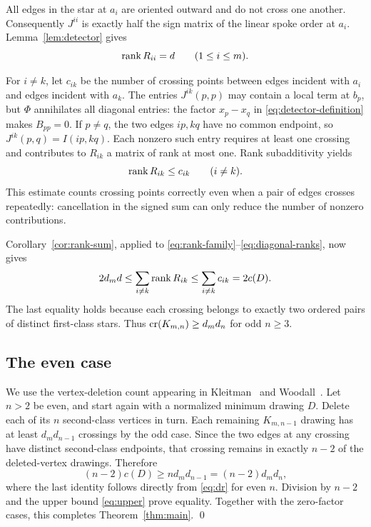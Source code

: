 All edges in the star at $a_i$ are oriented outward and do not cross one
another. Consequently $J^{ii}$ is exactly half the sign matrix of the
linear spoke order at $a_i$. Lemma~\ref{lem:detector} gives
\begin{equation}
\label{eq:diagonal-ranks}
 \operatorname{rank} R_{ii}=d\qquad(1\le i\le m).
\end{equation}

For $i\ne k$, let $c_{ik}$ be the number of crossing points between
edges incident with $a_i$ and edges incident with $a_k$.
The entries $J^{ik}(p,p)$ may contain a local term at $b_p$, but $\Phi$
annihilates all diagonal entries: the factor $x_p-x_q$ in
\eqref{eq:detector-definition} makes $B_{pp}=0$.
If $p\ne q$, the two edges $ip,kq$
have no common endpoint, so $J^{ik}(p,q)=I(ip,kq)$.
Each nonzero such entry requires at least one crossing and contributes
to $R_{ik}$ a matrix of rank at most one. Rank subadditivity yields
\begin{equation}
\label{eq:crossing-rank}
 \operatorname{rank} R_{ik}\le c_{ik}\qquad(i\ne k).
\end{equation}
This estimate counts crossing points correctly even when a pair of
edges crosses repeatedly: cancellation in the signed sum can only reduce
the number of nonzero contributions.

Corollary~\ref{cor:rank-sum}, applied to
\eqref{eq:rank-family}--\eqref{eq:diagonal-ranks}, now gives
\[
 2d_m d
 \le \sum_{i\ne k}\operatorname{rank} R_{ik}
 \le \sum_{i\ne k}c_{ik}
 =2c(D).
\]
The last equality holds because each crossing belongs to exactly two
ordered pairs of distinct first-class stars.
Thus $\operatorname{cr}(K_{m,n})\ge d_m d_n$ for odd $n\ge3$.

\subsection{The even case}
We use the vertex-deletion count appearing in
Kleitman~\cite[Section~3, equations~(6)--(7)]{Kleitman1970} and
Woodall~\cite[Theorem~1 and Corollary~1.1]{Woodall1993}.
Let $n>2$ be even, and start again with a normalized minimum drawing $D$.
Delete each of its $n$ second-class vertices in turn. Each remaining
$K_{m,n-1}$ drawing has at least $d_m d_{n-1}$ crossings by the odd case.
Since the two edges at any crossing have distinct second-class endpoints,
that crossing remains in exactly $n-2$ of the deleted-vertex drawings.
Therefore
\[
 (n-2)c(D)\ge n d_m d_{n-1}=(n-2)d_m d_n,
\]
where the last identity follows directly from \eqref{eq:dr} for even $n$.
Division by $n-2$ and the upper bound \eqref{eq:upper} prove equality.
Together with the zero-factor cases, this completes
Theorem~\ref{thm:main}. \qed
